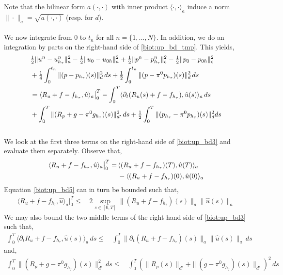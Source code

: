 Note that the bilinear form $a(\cdot, \cdot)$ with inner product $\langle \cdot, \cdot \rangle_a$ induce a norm $\|\cdot\|_a = \sqrt{a(\cdot, \cdot)}$ (resp. for $d$).
\\
\\
We now integrate from $0$ to $t_n$ for all $n=\{1,...,N\}$. In addition, we do an integration by parts on the right-hand side of \eqref{biot:up_bd_tmp}. This yields,
\\
\begin{align} \label{biot:up_bd3}
& \tfrac{1}{2}\|u^n - u^n_{h_\tau} \|^2_a - \tfrac{1}{2}\|u_0 - u_{0 h} \|^2_a + \tfrac{1}{2}\|p^n - p^n_{h_\tau} \|^2_c - \tfrac{1}{2}\|p_0 - p_{0 h} \|^2_c \\
& + \tfrac{1}{4}\int_0^{t_n} \|(p - p_{h_\tau})(s) \|^2_d \, ds  + \tfrac{1}{2}\int_0^{t_n} \|(p - \pi^0p_{h_\tau})(s) \|^2_d \, ds \notag\\
& = \langle R_u + f - f_{h_\tau}, \hat{u}\rangle_a \big|_0^T - \int_0^{T} \langle \partial_t (R_u(s) + f - f_{h_\tau}), \hat{u}(s)\rangle_a \, ds \notag \\
& + \int_0^{T} \| (R_p + g-\pi^0g_{h_\tau})(s) \|^2_{d'} \, ds + \tfrac{1}{2} \int_0^{T} \|(p_{h_\tau}-\pi^0p_{h_\tau})(s)\|_d^2 ds \notag
\end{align}
\\
We look at the first three terms on the right-hand side of \eqref{biot:up_bd3} and evaluate them separately. Observe that,
\begin{align} \label{biot:up_bd5}
\langle R_u + f - f_{h_\tau}, \hat{u}\rangle_a \big|_0^T = & \, \langle (R_u + f - f_{h_\tau})(T), \hat{u}(T)\rangle_a \\ 
& \, - \langle (R_u + f - f_{h_\tau})(0), \hat{u}(0)\rangle_a \notag
\end{align}
Equation \eqref{biot:up_bd5} can in turn be bounded such that, 
\begin{align}\label{biot:up_bd5a}
\langle R_u + f - f_{h_\tau}, \hat{u}\rangle_a \big|_0^T \leq & \, 2 \sup_{s \in [0,T]} \| (R_u + f - f_{h_\tau})(s)\|_a\| \hat{u}(s)\|_a 
\end{align}
We may also bound the two middle terms of the right-hand side of \eqref {biot:up_bd3} such that,
\begin{align} \label{biot:up_bd6}
\int_0^{T} \langle \partial_t R_u + f - f_{h_\tau}, \hat{u}(s)\rangle_a \, ds \leq & \, \int_0^{T} \| \partial_t (R_u + f - f_{h_\tau})(s)\|_a \|\hat{u}(s)\|_a \, ds
\end{align}
and, 
\begin{align} \label{biot:up_bd7}
\int_0^{T} \| (R_p + g-\pi^0g_{h_\tau})(s) \|^2_{d'} \, ds 
\leq & \, \int_0^{T} \left(\| R_p(s)\|_{d'}  + \|(g-\pi^0g_{h_\tau})(s)\|_{d'} \right)^2\, ds
\end{align}
